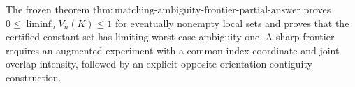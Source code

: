 The frozen theorem \(\mathrm{thm{:}matching\text{-}ambiguity\text{-}frontier\text{-}partial\text{-}answer}\) proves \(0\leq\liminf_n V_n(K)\leq1\) for eventually nonempty local sets and proves that the certified constant set has limiting worst-case ambiguity one. A sharp frontier requires an augmented experiment with a common-index coordinate and joint overlap intensity, followed by an explicit opposite-orientation contiguity construction.